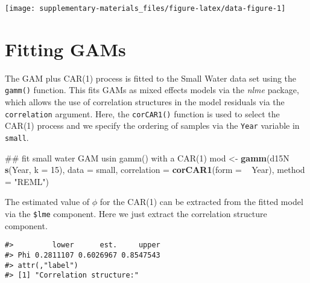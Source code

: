 \documentclass[12pt,]{article}
\newenvironment{Shaded}{\begin{snugshade}}{\end{snugshade}}
\newcommand{\KeywordTok}[1]{\textcolor[rgb]{0.13,0.29,0.53}{\textbf{{#1}}}}
\newcommand{\DataTypeTok}[1]{\textcolor[rgb]{0.13,0.29,0.53}{{#1}}}
\newcommand{\DecValTok}[1]{\textcolor[rgb]{0.00,0.00,0.81}{{#1}}}
\newcommand{\StringTok}[1]{\textcolor[rgb]{0.31,0.60,0.02}{{#1}}}
\newcommand{\NormalTok}[1]{{#1}}
\begin{document}
\begin{center}\texttt{[image: supplementary-materials\_files/figure-latex/data-figure-1]} \end{center}

\section{Fitting GAMs}\label{fitting-gams}

The GAM plus CAR(1) process is fitted to the Small Water data set using
the \texttt{gamm()} function. This fits GAMs as mixed effects models via
the \emph{nlme} package, which allows the use of correlation structures
in the model residuals via the \texttt{correlation} argument. Here, the
\texttt{corCAR1()} function is used to select the CAR(1) process and we
specify the ordering of samples via the \texttt{Year} variable in
\texttt{small}.

\begin{Shaded}
\begin{Highlighting}[]
\NormalTok{## fit small water GAM usin gamm() with a CAR(1)}
\NormalTok{mod <-}\StringTok{ }\KeywordTok{gamm}\NormalTok{(d15N ~}\StringTok{ }\KeywordTok{s}\NormalTok{(Year, }\DataTypeTok{k =} \DecValTok{15}\NormalTok{), }\DataTypeTok{data =} \NormalTok{small,}
            \DataTypeTok{correlation =} \KeywordTok{corCAR1}\NormalTok{(}\DataTypeTok{form =} \NormalTok{~}\StringTok{ }\NormalTok{Year), }\DataTypeTok{method =} \StringTok{"REML"}\NormalTok{)}
\end{Highlighting}
\end{Shaded}

The estimated value of \(\phi\) for the CAR(1) can be extracted from the
fitted model via the \texttt{\$lme} component. Here we just extract the
correlation structure component.

\begin{Shaded}
\end{Shaded}

\begin{verbatim}
#>         lower      est.     upper
#> Phi 0.2811107 0.6026967 0.8547543
#> attr(,"label")
#> [1] "Correlation structure:"
\end{verbatim}
\end{document}
